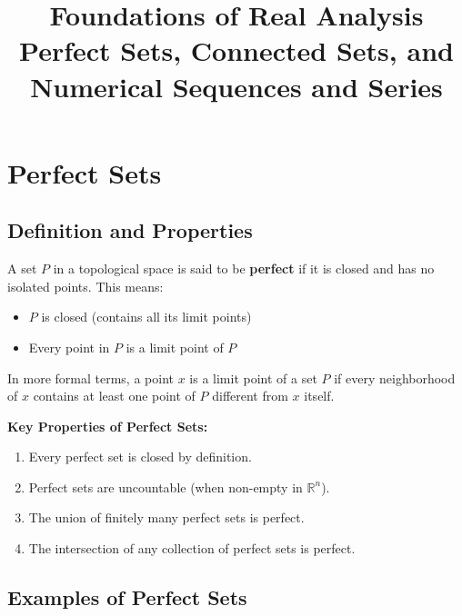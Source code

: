 \documentclass{article}
\begin{document}
\title{Foundations of Real Analysis\\
\large Perfect Sets, Connected Sets, and Numerical Sequences and Series}
\author{}
\date{}
\maketitle

\tableofcontents

\bigskip

\section{Perfect Sets} \label{perfect-sets}

\subsection{Definition and Properties} \label{perfect-sets-definition}

A set $P$ in a topological space is said to be \textbf{perfect} if it is closed and has no isolated points. This means:
\begin{itemize}
    \item $P$ is closed (contains all its limit points)
    \item Every point in $P$ is a limit point of $P$
\end{itemize}

In more formal terms, a point $x$ is a limit point of a set $P$ if every neighborhood of $x$ contains at least one point of $P$ different from $x$ itself.

\textbf{Key Properties of Perfect Sets:}
\begin{enumerate}[label=(\arabic*)]
    \item Every perfect set is closed by definition.
    \item Perfect sets are uncountable (when non-empty in $\mathbb{R}^n$).
    \item The union of finitely many perfect sets is perfect.
    \item The intersection of any collection of perfect sets is perfect.
\end{enumerate}

\subsection{Examples of Perfect Sets} \label{perfect-sets-examples}
\end{document}
